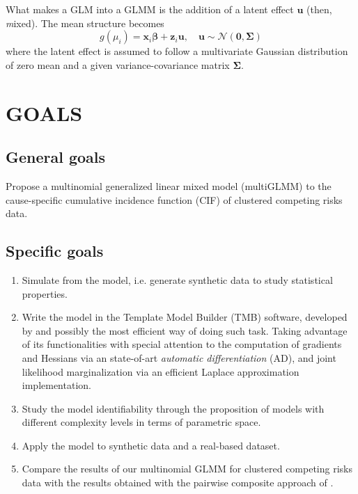 What makes a GLM into a GLMM \cite{GLMM} is the addition of a latent
effect \(\mathbf{u}\) (then, \textit{m}ixed). The mean structure becomes
\[
  g(\mu_{i}) = \bm{x}_{i}\bm{\beta} + \mathbf{z}_{i}\mathbf{u},
  \quad \mathbf{u} \sim \mathcal{N}(\mathbf{0},\bm{\Sigma})
\]
where the latent effect is assumed to follow a multivariate Gaussian
distribution of zero mean and a given variance-covariance matrix
\(\bm{\Sigma}\).

\section{GOALS}

\subsection{General goals}

Propose a multinomial generalized linear mixed model (multiGLMM) to the
cause-specific cumulative incidence function (CIF) of clustered
competing risks data.

\subsection{Specific goals}

\begin{enumerate}
\item Simulate from the model, i.e. generate synthetic data to study
  statistical properties.

\item Write the model in the Template Model Builder (TMB) software,
  developed by  and possibly the most efficient way of
  doing such task. Taking advantage of its functionalities with special
  attention to the computation of gradients and Hessians via an
  state-of-art \textit{automatic differentiation} (AD), and joint
  likelihood marginalization via an efficient Laplace approximation
  implementation.

\item Study the model identifiability through the proposition of models
  with different complexity levels in terms of parametric space.

\item Apply the model to synthetic data and a real-based dataset.

\item Compare the results of our multinomial GLMM for clustered
  competing risks data with the results obtained with the pairwise
  composite approach of .
\end{enumerate}

